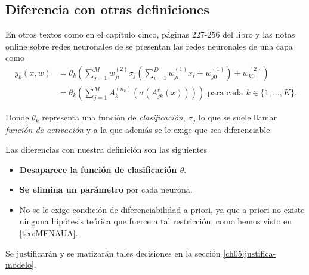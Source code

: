 \subsection*{Diferencia con otras definiciones}  \label{subsection:diferencia-otras-definiciones-RRNN}

En otros textos como en el capítulo cinco, páginas 227-256 del libro \cite{BishopPaterRecognition} y las notas online sobre redes neuronales de \cite{MostafaLearningFromData} se presentan las redes neuronales de una capa como 
\begin{align}
    y_k(x,w) &= \theta_k 
    \left( 
        \sum^M_{j=1} w_{ji}^{(2)}
        \sigma_j 
        \left(
            \sum_{i=1}^D w_{ji}^{(1)} x_i + w_{j0}^{(1)}
        \right)
        + w_{k0}^{(2)}
    \right) 
    \\
    & = 
    \theta_k 
    \left( 
        \sum^M_{j=1} A^{(n_k)}_{k}
        \left(
            \sigma 
            \left(
                A^{r}_{j k}
                \left(
                    x
                \right)
            \right)
        \right)
    \right)
    \text{ para cada  } k \in \{1, \ldots, K \}.
\end{align}

Donde $\theta_k$ representa una función de \textit{clasificación}, 
$\sigma_j$ lo que se suele llamar \textit{función de activación} y a la que además se le exige que sea diferenciable.

Las diferencias con nuestra definición son las siguientes 
\begin{itemize}
    \item \textbf{Desaparece la función de clasificación $\theta$}.
    \item \textbf{Se elimina un parámetro} por cada neurona. 
    \item No se le exige condición de diferenciabilidad a priori, ya que a priori no existe ninguna hipótesis teórica que fuerce a tal restricción, como hemos visto en \ref{teo:MFNAUA}.
\end{itemize}
Se justificarán y se matizarán tales decisiones en 
la sección \ref{ch05:justifica-modelo}.
